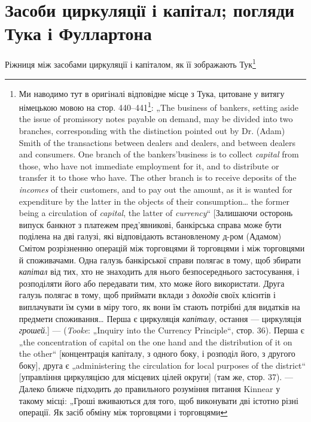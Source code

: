 
\section{Засоби циркуляції і капітал; погляди Тука
і Фуллартона}

Ріжниця між засобами циркуляції і капіталом, як її зображають Тук\footnote{Ми наводимо тут в оригіналі відповідне місце з Тука, цитоване у витягу
німецькою мовою на стор. 440--441\footnote*{Сторінки за німецьким виданням ІМЕЛ; в цьому українському виданні
відповідне місце цитується на стор. 385. \emph{Ред. укр. перекладу.}}: „The business of bankers, setting aside the
issue of promissory notes payable on demand, may be divided into two branches,
corresponding with the distinction pointed out by Dr. (Adam) Smith of the transactions between
dealers and dealers, and between dealers and consumers. One branch
of the bankers’business is to collect \emph{capital} from those, who have not immediate
employment for it, and to distribute or transfer it to those who have. The other
branch is to receive deposits of the \emph{incomes} of their customers, and to pay out
the amount, as it is wanted for expenditure by the latter in the objects of their
consumption\dots{} the former being a circulation of \emph{capital}, the latter of \emph{currency}“ [Залишаючи
осторонь випуск банкнот з платежем пред’явникові, банкірська справа
може бути поділена на дві галузі, які відповідають встановленому д-ром (Адамом)
Смітом розрізненню операцій між торговцями й торговцями і між торговцями й
споживачами. Одна галузь банкірської справи полягає в тому, щоб збирати
\emph{капітал} від тих, хто не знаходить для нього безпосереднього застосування,
і розподіляти його або передавати тим, хто може його використати. Друга галузь
полягає в тому, щоб приймати вклади з \emph{доходів} своїх клієнтів і виплачувати їм
суми в міру того, як вони їм стають потрібні для видатків на предмети споживання\dots{} Перша є
циркуляція \emph{капіталу}, остання — циркуляція \emph{грошей}.] —
(\emph{Tooke}: „Inquiry into the Currency Principle“, стор. 36). Перша є „the concentration of capital on
the one hand and the distribution of it on the other“ [концентрація
капіталу, з одного боку, і розподіл його, з другого боку], друга є „administering
the circulation for local purposes of the district“ [управління циркуляцією для
місцевих цілей округи] (там же, стор. 37). — Далеко ближче підходить до
правильного розуміння питання Kinnear у такому місці: „Гроші вживаються
для того, щоб виконувати дві істотно різні операції. Як засіб обміну між торговцями і торговцями
}
